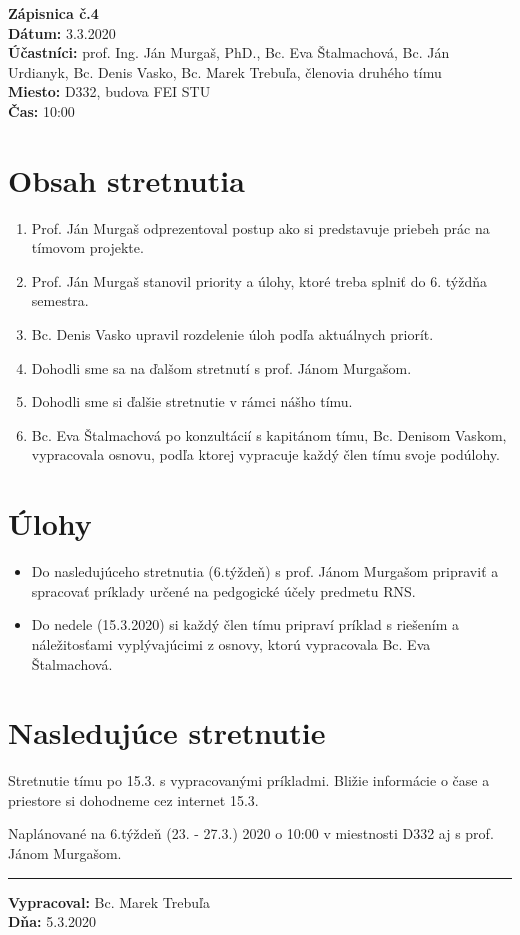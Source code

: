 
\usepackage{parskip}%

	\textbf{{\Huge Zápisnica č.4}}\\
			
	\textbf{Dátum:} 3.3.2020\\	
		
	\textbf{Účastníci:} prof. Ing. Ján Murgaš, PhD., Bc. Eva Štalmachová, Bc. Ján Urdianyk, Bc. Denis Vasko, Bc. Marek Trebuľa, členovia druhého tímu\\

	\textbf{Miesto:} D332, budova FEI STU\\	
	
	\textbf{Čas:} 10:00    
    \section*{Obsah stretnutia}
    \begin{enumerate}
    	\item Prof. Ján Murgaš odprezentoval postup ako si predstavuje priebeh prác na tímovom projekte.
    	\item Prof. Ján Murgaš stanovil priority a úlohy, ktoré treba splniť do 6. týždňa semestra.
    	\item Bc. Denis Vasko upravil rozdelenie úloh podľa aktuálnych priorít.
    	\item Dohodli sme sa na ďalšom stretnutí s prof. Jánom Murgašom.
    	\item Dohodli sme si ďalšie stretnutie v rámci nášho tímu.
    	\item Bc. Eva Štalmachová po konzultácií s kapitánom tímu, Bc. Denisom Vaskom, vypracovala osnovu, podľa ktorej vypracuje každý člen tímu svoje podúlohy.
    \end{enumerate}    
    \section*{Úlohy}
    \begin{itemize}
    	\item Do nasledujúceho stretnutia (6.týždeň) s prof. Jánom Murgašom pripraviť a spracovať príklady určené na pedgogické účely predmetu RNS.
    	\item Do nedele (15.3.2020) si každý člen tímu pripraví príklad s riešením a \\ náležitosťami vyplývajúcimi z osnovy, ktorú vypracovala Bc. Eva Štalmachová.
    \end{itemize}

    \section*{Nasledujúce stretnutie}
    
    Stretnutie tímu po 15.3. s vypracovanými príkladmi. Bližie informácie o čase a priestore si dohodneme cez internet 15.3.

    Naplánované na 6.týždeň (23. - 27.3.) 2020 o 10:00 v miestnosti D332 aj s prof. Jánom Murgašom.
    
    \noindent\rule{15cm}{0.4pt}
   {\small 	\textbf{Vypracoval:} Bc. Marek Trebuľa\\
   \textbf{Dňa:} 5.3.2020 }
    

